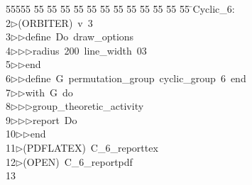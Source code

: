 %
%
\begin{tabbing}
55555 \= 55 \= 55 \= 55 \= 55 \= 55 \= 55 \= 55 \= 55 \= 55 \= 55 \= 55 \= 55 \= \>Cyclic\_6:\\[0pt]
2\>$\triangleright$\>(ORBITER)\ v\ 3\ \\[0pt]
3\>$\triangleright$\>$\triangleright$\>define\ Do\ draw\_options\ \\[0pt]
4\>$\triangleright$\>$\triangleright$\>$\triangleright$\>radius\ 200\ line\_width\ 03\ \\[0pt]
5\>$\triangleright$\>$\triangleright$\>end\ \\[0pt]
6\>$\triangleright$\>$\triangleright$\>define\ G\ permutation\_group\ cyclic\_group\ 6\ end\ \\[0pt]
7\>$\triangleright$\>$\triangleright$\>with\ G\ do\ \\[0pt]
8\>$\triangleright$\>$\triangleright$\>$\triangleright$\>group\_theoretic\_activity\ \\[0pt]
9\>$\triangleright$\>$\triangleright$\>$\triangleright$\>report\ Do\ \\[0pt]
10\>$\triangleright$\>$\triangleright$\>end\\[0pt]
11\>$\triangleright$\>(PDFLATEX)\ C\_6\_reporttex\\[0pt]
12\>$\triangleright$\>(OPEN)\ C\_6\_reportpdf\\[0pt]
13\>\end{tabbing}
